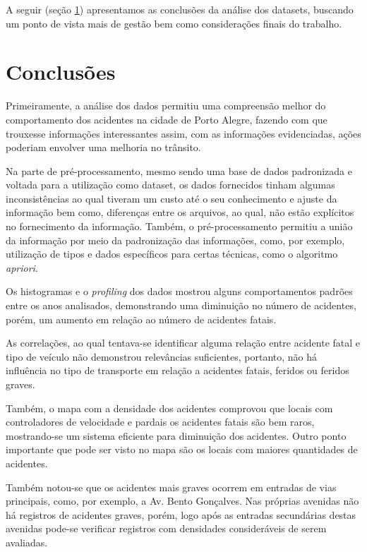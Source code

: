 \documentclass[11pt,article,oneside,a4paper]{abntex2}
\begin{document}
A seguir (seção \ref{sec:conclusao}) apresentamos as conclusões da análise dos datasets, buscando um ponto de vista mais de gestão bem como considerações finais do trabalho.


\section{Conclusões}
\label{sec:conclusao}

Primeiramente, a análise dos dados permitiu uma compreensão melhor do comportamento dos acidentes na cidade de Porto Alegre, fazendo com que trouxesse informações interessantes assim, com as informações evidenciadas, ações poderiam envolver uma melhoria no trânsito.

Na parte de pré-processamento, mesmo sendo uma base de dados padronizada e voltada para a utilização como dataset, os dados fornecidos tinham algumas inconsistências ao qual tiveram um custo até o seu conhecimento e ajuste da informação bem como, diferenças entre os arquivos, ao qual, não estão explícitos no fornecimento da informação. Também, o pré-processamento permitiu a união da informação por meio da padronização das informações, como, por exemplo, utilização de tipos e dados específicos para certas técnicas, como o algoritmo \textit{apriori}.

Os histogramas e o \textit{profiling} dos dados mostrou alguns comportamentos padrões entre os anos analisados, demonstrando uma diminuição no número de acidentes, porém, um aumento em relação ao número de acidentes fatais.

As correlações, ao qual tentava-se identificar alguma relação entre acidente fatal e tipo de veículo não demonstrou relevâncias suficientes, portanto, não há influência no tipo de transporte em relação a acidentes fatais, feridos ou feridos graves.

Também, o mapa com a densidade dos acidentes comprovou que locais com controladores de velocidade e pardais os acidentes fatais são bem raros, mostrando-se um sistema eficiente para diminuição dos acidentes. Outro ponto importante que pode ser visto no mapa são os locais com maiores quantidades de acidentes. 

Também notou-se que os acidentes mais graves ocorrem em entradas de vias principais, como, por exemplo, a Av. Bento Gonçalves. Nas próprias avenidas não há registros de acidentes graves, porém, logo após as entradas secundárias destas avenidas pode-se verificar registros com densidades consideráveis de serem avaliadas.
\end{document}
